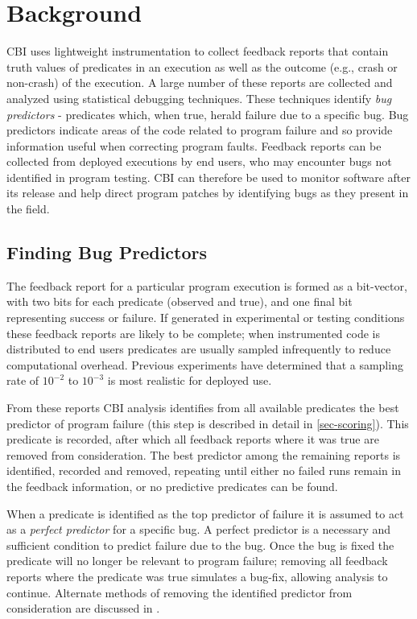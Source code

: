 
\section{Background}
\label{sec-bground}
CBI uses lightweight instrumentation to collect feedback reports that contain truth values of predicates in an execution as well as the outcome (e.g., crash or non-crash) of the execution.  A large number of these reports are collected and analyzed using statistical debugging techniques.  These techniques identify \emph{bug predictors} - predicates which, when true, herald failure due to a specific bug.  Bug predictors indicate areas of the code related to program failure and so provide information useful when correcting program faults.  Feedback reports can be collected from deployed executions by end users, who may encounter bugs not identified in program testing.  CBI can therefore be used to monitor software after its release and help direct program patches by identifying bugs as they present in the field.

\subsection{Finding Bug Predictors}
\label{sec-elimalg}
The feedback report for a particular program execution is formed as a bit-vector, with two bits for each predicate (observed and true), and one final bit representing success or failure.  If generated in experimental or testing conditions these feedback reports are likely to be complete; when instrumented code is distributed to end users predicates are usually sampled infrequently to reduce computational overhead.  Previous experiments \cite{Liblit:2003:BIRPS} have determined that a sampling rate of $10^{-2}$ to $10^{-3}$ is most realistic for deployed use.

From these reports CBI analysis identifies from all available predicates the best predictor of program failure (this step is described in detail in \autoref{sec-scoring}).  This predicate is recorded, after which all feedback reports where it was true are removed from consideration.  The best predictor among the remaining reports is identified, recorded and removed, repeating until either no failed runs remain in the feedback information, or no predictive predicates can be found.

When a predicate is identified as the top predictor of failure it is assumed to act as a \emph{perfect predictor} for a specific bug.  A perfect predictor is a necessary and sufficient condition to predict failure due to the bug.  Once the bug is fixed the predicate will no longer be relevant to program failure; removing all feedback reports where the predicate was true simulates a bug-fix, allowing analysis to continue.  Alternate methods of removing the identified predictor from consideration are discussed in \cite{Liblit:2005:SSBI}.

